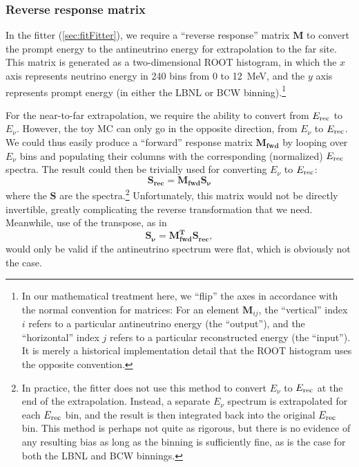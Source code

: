 \documentclass[../thesis.tex]{subfiles}
\begin{document}
\subsubsection{Reverse response matrix}

In the fitter (\autoref{sec:fitFitter}), we require a ``reverse response'' matrix $\mathbf{M}$ to convert the prompt energy to the antineutrino energy for extrapolation to the far site. This matrix is generated as a two-dimensional ROOT histogram, in which the $x$ axis represents neutrino energy in 240 bins from 0 to 12~MeV, and the $y$ axis represents prompt energy (in either the LBNL or BCW binning).\footnote{In our mathematical treatment here, we ``flip'' the axes in accordance with the normal convention for matrices: For an element $\mathbf{M}_{ij}$, the ``vertical'' index $i$ refers to a particular antineutrino energy (the ``output''), and the ``horizontal'' index $j$ refers to a particular reconstructed energy (the ``input''). It is merely a historical implementation detail that the ROOT histogram uses the opposite convention.}

\begin{comment}
  I don't see any reason to mention the fact that a finer binning (2880 instead of 240) is used internally by the toy MC when generating this matrix. With the standard 240 bins, the edges line up with both the LBNL and BCW edges, so there shouldn't be any benefit from using a finer binning.

  deleted: Internally, the toy MC normally represents both neutrino and prompt energy using 240 bins (of 50~keV) from 0 to 12~MeV.
\end{comment}

For the near-to-far extrapolation, we require the ability to convert from $E_\mathrm{rec}$ to $E_\nu$. However, the toy MC can only go in the opposite direction, from $E_\nu$ to $E_\mathrm{rec}$. We could thus easily produce a ``forward'' response matrix $\mathbf{M_{fwd}}$ by looping over $E_\nu$ bins and populating their columns with the corresponding (normalized) $E_\mathrm{rec}$ spectra. The result could then be trivially used for converting $E_\nu$ to $E_\mathrm{rec}$:
\begin{equation}
  \mathbf{S_{rec}} = \mathbf{M_{fwd}} \mathbf{S_\nu} 
\end{equation}
where the $\mathbf{S}$ are the spectra.\footnote{\label{foot:fitEnuToErec}In practice, the fitter does not use this method to convert $E_\nu$ to $E_\mathrm{rec}$ at the end of the extrapolation. Instead, a separate $E_\nu$ spectrum is extrapolated for each $E_\mathrm{rec}$ bin, and the result is then integrated back into the original $E_\mathrm{rec}$ bin. This method is perhaps not quite as rigorous, but there is no evidence of any resulting bias as long as the binning is sufficiently fine, as is the case for both the LBNL and BCW binnings.} Unfortunately, this matrix would not be directly invertible, greatly complicating the reverse transformation that we need. Meanwhile, use of the transpose, as in
\begin{equation}
  \mathbf{S_\nu} = \mathbf{M_{fwd}^{T}} \mathbf{S_{rec}},
\end{equation}
would only be valid if the antineutrino spectrum were flat, which is obviously not the case.
\end{document}
